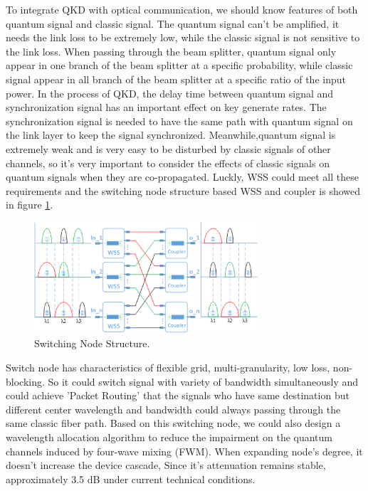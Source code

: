 \documentclass[letterpaper,10pt]{article}
\begin{document}
To integrate QKD with optical communication, we should know features of both quantum signal and classic signal. The quantum signal can't be amplified, it needs the link loss to be extremely low, while the classic signal is not sensitive to the link loss. When passing through the beam splitter, quantum signal only appear in one branch of the beam splitter at a specific probability, while classic signal appear in all branch of the beam splitter at a specific ratio of the input power. In the process of QKD, the delay time between quantum signal and synchronization signal has an important effect on key generate rates. The synchronization signal is needed to have the same path with quantum signal on the link layer to keep the signal synchronized. Meanwhile,quantum signal is extremely weak and is very easy to be disturbed by classic signals of other channels, so it's very important to consider the effects of classic signals on quantum signals when they are co-propagated. Luckly, WSS could meet all these requirements and the switching node structure based WSS and coupler is showed in figure \ref{Fig:switching_node_structure}.

\begin{figure}[htbp]
  \centering
  \includegraphics[width=8.3cm]{swtiching_node_struct}
  \caption{Switching Node Structure.} \label{Fig:switching_node_structure}
\end{figure}
Switch node has characteristics of flexible grid, multi-granularity, low loss, non-blocking. So it could switch signal with variety of bandwidth simultaneously and could achieve 'Packet Routing' that the signals who have same destination but different center wavelength and bandwidth could always passing through the same classic fiber path. Based on this switching node, we could also design a wavelength allocation algorithm to reduce the impairment on the quantum channels induced by four-wave mixing (FWM). When expanding node's degree, it doesn't increase the device cascade, Since it's attenuation remains stable, approximately 3.5 dB under current technical conditions. 
\end{document}
